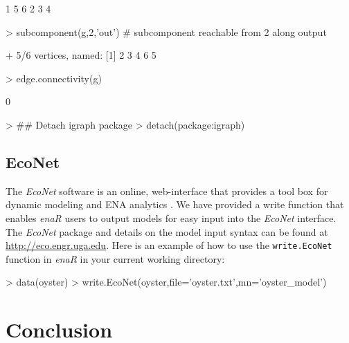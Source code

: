 \documentclass[article]{jss}
\begin{document}
\begin{Schunk}
\begin{Soutput}
[1] 1 5 6 2 3 4
\end{Soutput}
\begin{Sinput}
> subcomponent(g,2,'out') # subcomponent reachable from 2 along output
\end{Sinput}
\begin{Soutput}
+ 5/6 vertices, named:
[1] 2 3 4 6 5
\end{Soutput}
\begin{Sinput}
> edge.connectivity(g)
\end{Sinput}
\begin{Soutput}
[1] 0
\end{Soutput}
\begin{Sinput}
> ## Detach igraph package
> detach(package:igraph)
\end{Sinput}
\end{Schunk}

\subsection{EcoNet}

The \textit{EcoNet} software is an online, web-interface that provides
a tool box for dynamic modeling and ENA analytics \citep{kazanci07}. We
have provided a write function that enables \textit{enaR} users to
output models for easy input into the \textit{EcoNet} interface. The
\textit{EcoNet} package and details on the model input syntax can be
found at \url{http://eco.engr.uga.edu}. Here is an example of how to
use the \texttt{write.EcoNet} function in \textit{enaR} in your
current working directory:

\begin{Schunk}
\begin{Sinput}
> data(oyster)
> write.EcoNet(oyster,file='oyster.txt',mn='oyster_model')
\end{Sinput}
\end{Schunk}


\section{Conclusion}
\end{document}
